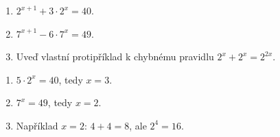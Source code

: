 \documentclass[11pt,a4paper]{article}
\begin{document}
\begin{zadaniReseniBox}[title={Domácí úkol}]
\begin{enumerate}[label=\alph*)]
\item $2^{x+1}+3\cdot2^x=40$.
\item $7^{x+1}-6\cdot7^x=49$.
\item Uveď vlastní protipříklad k chybnému pravidlu $2^x+2^x=2^{2x}$.
\end{enumerate}
\tcblower
\begin{enumerate}[label=\alph*)]
\item $5\cdot2^x=40$, tedy $x=3$.
\item $7^x=49$, tedy $x=2$.
\item Například $x=2$: $4+4=8$, ale $2^4=16$.
\end{enumerate}
\end{zadaniReseniBox}
\end{document}
